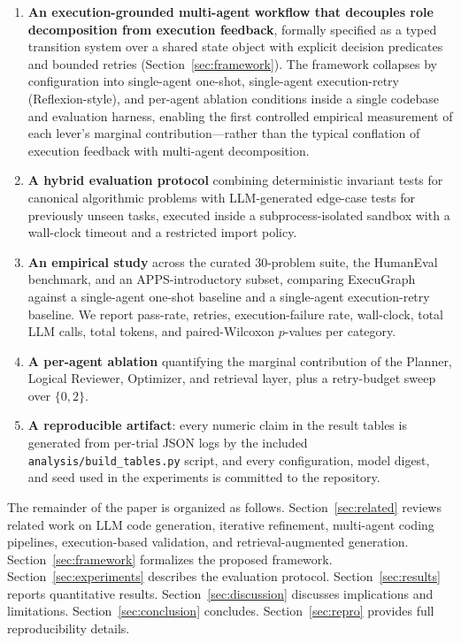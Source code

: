 \documentclass[journal]{IEEEtran}
\begin{document}
\begin{enumerate}
  \item \textbf{An execution-grounded multi-agent workflow that decouples role decomposition from execution feedback}, formally specified as a typed transition system over a shared state object with explicit decision predicates and bounded retries (Section~\ref{sec:framework}). The framework collapses by configuration into single-agent one-shot, single-agent execution-retry (Reflexion-style), and per-agent ablation conditions inside a single codebase and evaluation harness, enabling the first controlled empirical measurement of each lever's marginal contribution---rather than the typical conflation of execution feedback with multi-agent decomposition.
  \item \textbf{A hybrid evaluation protocol} combining deterministic invariant tests for canonical algorithmic problems with LLM-generated edge-case tests for previously unseen tasks, executed inside a subprocess-isolated sandbox with a wall-clock timeout and a restricted import policy.
  \item \textbf{An empirical study} across the curated 30-problem suite, the HumanEval benchmark, and an APPS-introductory subset, comparing ExecuGraph against a single-agent one-shot baseline and a single-agent execution-retry baseline. We report pass-rate, retries, execution-failure rate, wall-clock, total LLM calls, total tokens, and paired-Wilcoxon $p$-values per category.
  \item \textbf{A per-agent ablation} quantifying the marginal contribution of the Planner, Logical Reviewer, Optimizer, and retrieval layer, plus a retry-budget sweep over $\{0, 2\}$.
  \item \textbf{A reproducible artifact}: every numeric claim in the result tables is generated from per-trial JSON logs by the included \texttt{analysis/build\_tables.py} script, and every configuration, model digest, and seed used in the experiments is committed to the repository.
\end{enumerate}

The remainder of the paper is organized as follows. Section~\ref{sec:related} reviews related work on LLM code generation, iterative refinement, multi-agent coding pipelines, execution-based validation, and retrieval-augmented generation. Section~\ref{sec:framework} formalizes the proposed framework. Section~\ref{sec:experiments} describes the evaluation protocol. Section~\ref{sec:results} reports quantitative results. Section~\ref{sec:discussion} discusses implications and limitations. Section~\ref{sec:conclusion} concludes. Section~\ref{sec:repro} provides full reproducibility details.
\end{document}
